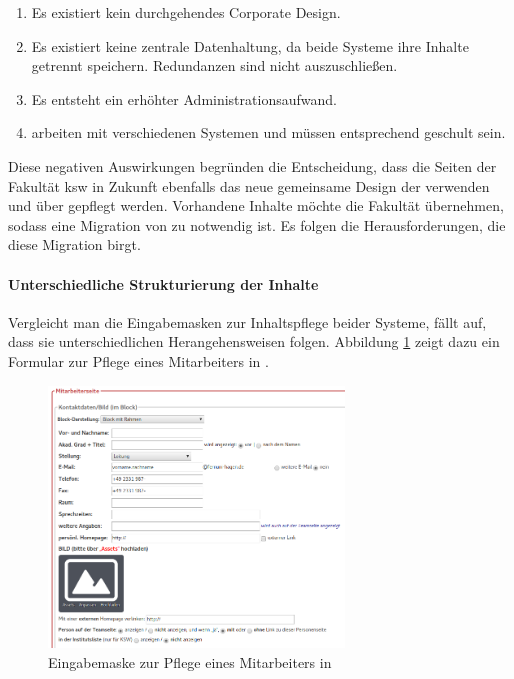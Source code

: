         \begin{enumerate}
            \item   Es existiert kein durchgehendes Corporate Design.
            \item   Es existiert keine zentrale Datenhaltung, da beide Systeme ihre Inhalte getrennt speichern.
                    Redundanzen sind nicht auszuschließen.
            \item   Es entsteht ein erhöhter Administrationsaufwand.
            \item   {\editors} arbeiten mit verschiedenen Systemen und müssen entsprechend geschult sein.
        \end{enumerate}

        Diese negativen Auswirkungen 
        begründen die Entscheidung, dass die Seiten der Fakultät \gls{ksw}
        in Zukunft ebenfalls das neue gemeinsame Design der {\fernUni} verwenden und
        über {\imperia} gepflegt werden.
        Vorhandene Inhalte möchte die Fakultät übernehmen,
        sodass eine Migration von {\wordpress} zu {\imperia} notwendig ist.
        Es folgen die Herausforderungen, die diese Migration birgt.

        \paragraph{Unterschiedliche Strukturierung der Inhalte}
        Vergleicht man die Eingabemasken zur Inhaltspflege beider Systeme, fällt auf,
        dass sie unterschiedlichen Herangehensweisen folgen.
        Abbildung \ref{image:introductionFernUniImperiaForm} zeigt dazu ein Formular
        zur Pflege eines Mitarbeiters in {\imperia}.

        \begin{figure}[htb]
            \centering
            \includegraphics[width=0.7\textwidth]{../resources/imperia/team.png}
            \caption{Eingabemaske zur Pflege eines Mitarbeiters in {\imperia}}
            \label{image:introductionFernUniImperiaForm}
        \end{figure}

